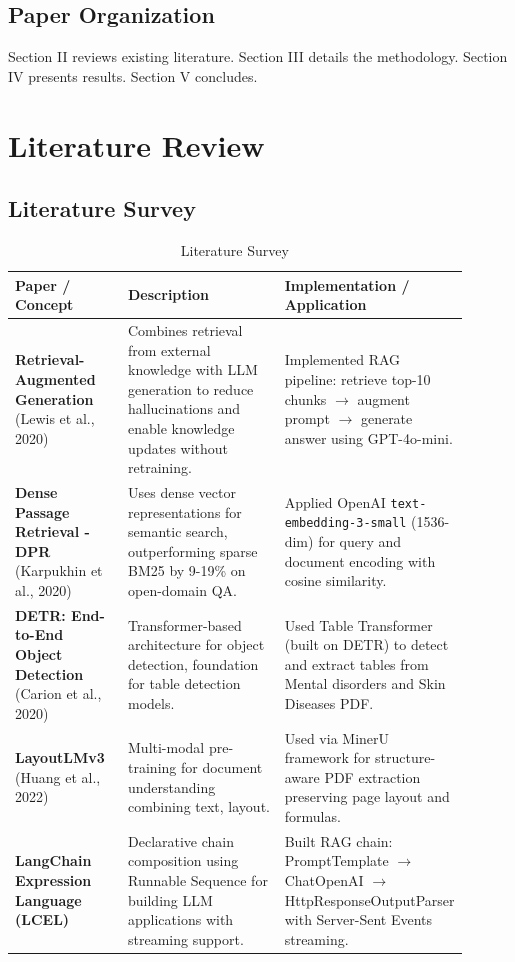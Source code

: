 \documentclass[conference]{IEEEtran}
\begin{document}
\subsection{Paper Organization}
Section II reviews existing literature. Section III details the methodology. Section IV presents results. Section V concludes.

\section{Literature Review}

\subsection{Literature Survey}

\begin{table}[htbp]
\caption{Literature Survey}
\begin{center}
\begin{tabular}{|p{0.25\linewidth}|p{0.35\linewidth}|p{0.3\linewidth}|}
\hline
\textbf{Paper / Concept} & \textbf{Description} & \textbf{Implementation / Application} \\
\hline
\textbf{Retrieval-Augmented Generation} (Lewis et al., 2020) & Combines retrieval from external knowledge with LLM generation to reduce hallucinations and enable knowledge updates without retraining. & Implemented RAG pipeline: retrieve top-10 chunks $\rightarrow$ augment prompt $\rightarrow$ generate answer using GPT-4o-mini. \\
\hline
\textbf{Dense Passage Retrieval - DPR} (Karpukhin et al., 2020) & Uses dense vector representations for semantic search, outperforming sparse BM25 by 9-19\% on open-domain QA. & Applied OpenAI \texttt{text-embedding-3-small} (1536-dim) for query and document encoding with cosine similarity. \\
\hline
\textbf{DETR: End-to-End Object Detection} (Carion et al., 2020) & Transformer-based architecture for object detection, foundation for table detection models. & Used Table Transformer (built on DETR) to detect and extract tables from Mental disorders and Skin Diseases PDF. \\
\hline
\textbf{LayoutLMv3} (Huang et al., 2022) & Multi-modal pre-training for document understanding combining text, layout. & Used via MinerU framework for structure-aware PDF extraction preserving page layout and formulas. \\
\hline
\textbf{LangChain Expression Language (LCEL)} & Declarative chain composition using Runnable Sequence for building LLM applications with streaming support. & Built RAG chain: PromptTemplate $\rightarrow$ ChatOpenAI $\rightarrow$ HttpResponseOutputParser with Server-Sent Events streaming. \\
\hline
\end{tabular}
\label{tab:literature}
\end{center}
\end{table}
\end{document}
